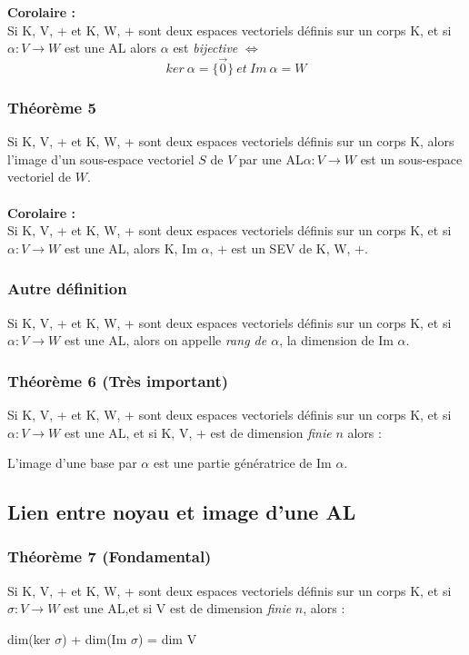 \documentclass[12pt, a4paper, openany]{article}
\begin{document}
\textbf{Corolaire :}\\
Si K, V, + et K, W, + sont deux espaces vectoriels définis sur un corps K,  et si $\alpha : V \rightarrow W$ est une AL alors $\alpha$ est \textit{bijective} $\Leftrightarrow$
$$ker\ \alpha = \{\vec{0}\}\ et\ Im\ \alpha = W$$

\subsubsection{Théorème 5}
Si K, V, + et K, W, + sont deux espaces vectoriels définis sur un corps K, alors l'image d'un sous-espace vectoriel $S$ de $V$ par une AL$\alpha : V \rightarrow W$ est un sous-espace vectoriel de $W$.
\\\\
\textbf{Corolaire :}\\
Si K, V, + et K, W, + sont deux espaces vectoriels définis sur un corps K,  et si $\alpha : V \rightarrow W$ est une AL, alors K, Im $\alpha$, + est un SEV de K, W, +.

\subsubsection{Autre définition}
Si K, V, + et K, W, + sont deux espaces vectoriels définis sur un corps K,  et si $\alpha : V \rightarrow W$ est une AL, alors on appelle \textit{rang de $\alpha$}, la dimension de Im $\alpha$.

\subsubsection{Théorème 6 (Très important)}
Si K, V, + et K, W, + sont deux espaces vectoriels définis sur un corps K,  et si $\alpha : V \rightarrow W$ est une AL, et si K, V, + est de dimension \textit{finie} $n$ alors :
\begin{center}
L'image d'une base par $\alpha$ est une partie génératrice de Im $\alpha$.
\end{center}

\subsection{Lien entre noyau et image d'une AL}
\subsubsection{Théorème 7 (Fondamental)}
Si K, V, + et K, W, + sont deux espaces vectoriels définis sur un corps K,  et si $\sigma : V \rightarrow W$ est une AL,et si V est de dimension \textit{finie} $n$, alors :
\begin{center}
dim(ker $\sigma$) + dim(Im $\sigma$) = dim V
\end{center}
\end{document}
